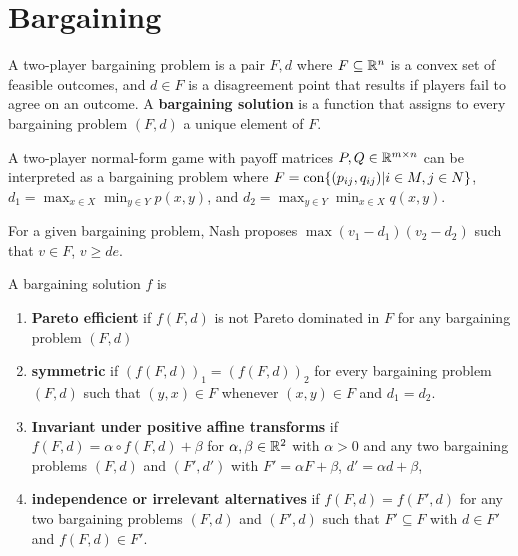 \section{Bargaining}
\label{sec:bargaining}

\begin{defn}
  \label{sec:bargaining-1}
  A two-player bargaining problem is a pair $F, d$ where $F \subseteq
  \mathbb{R}^{n}$ is a convex set of feasible outcomes, and $d \in F$ is a
  disagreement point that results if players fail to agree on an
  outcome.  A \textbf{bargaining solution} is a function that assigns
  to every bargaining problem $(F, d)$ a unique element of $F$.

  A two-player normal-form game with payoff matrices $P, Q \in \mathbb{R}^{m
    \times n}$ can be interpreted as a bargaining problem where $F =
  \operatorname*{con} \{ (p_{ij}, q_{ij}) | i \in M, j \in N \} $, $d_{1} = \max_{x
    \in X} \min_{y \in Y} p(x, y)$, and $d_{2} = \max_{y \in Y}
  \min_{x \in X} q(x, y)$.
\end{defn}

\begin{thm}
  \label{sec:bargaining-2}
  For a given bargaining problem, Nash proposes $\max (v_{1} -
  d_{1})(v_{2} - d_{2})$ such that $v \in F$, $v \geq de$.
\end{thm}

\begin{defn}
  \label{sec:bargaining-3}
  A bargaining solution $f$ is
  \begin{enumerate}
  \item \textbf{Pareto efficient} if $f(F, d)$ is not Pareto dominated
    in $F$ for any bargaining problem $(F, d)$
  \item \textbf{symmetric} if $(f(F, d))_{1} = (f(F, d))_{2}$ for
    every bargaining problem $(F, d)$ such that $(y, x) \in F$
    whenever $(x, y) \in F$ and $d_{1} = d_{2}$.
  \item \textbf{Invariant under positive affine transforms} if $f(F, d) =
    \alpha \circ f(F, d) + \beta$ for $\alpha, \beta \in \mathbb{R}^{2}$ with
    $\alpha > 0$ and any two bargaining problems $(F, d)$ and $(F',
    d')$ with $F' = \alpha F + \beta$, $d' = \alpha d + \beta$,
  \item \textbf{independence or irrelevant alternatives} if $f(F, d) =
    f(F', d)$ for any two bargaining problems $(F, d)$ and $(F', d)$
    such that $F' \subseteq F$ with $d \in F'$ and $f(F, d) \in F'$.
  \end{enumerate}
\end{defn}

